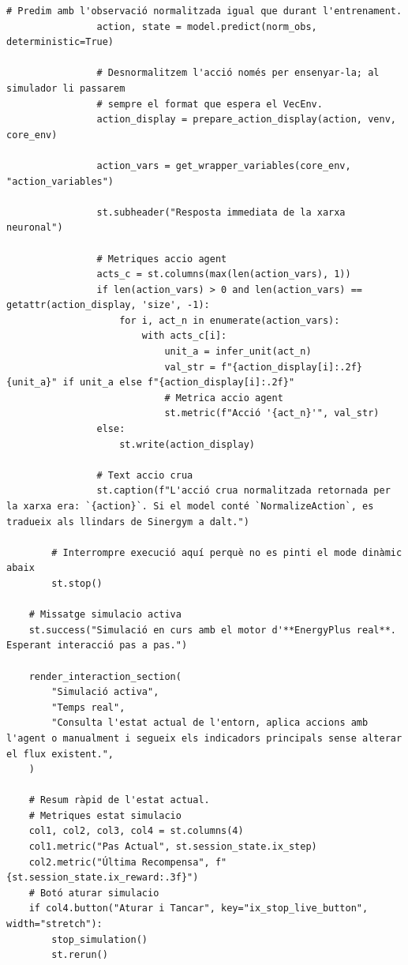 \documentclass[10pt,a4paper]{article}
\begin{document}
\begin{lstlisting}[style=studioPython,caption={pages/Interaccionar\_amb\_l'Agent.py},label={lst:pages-interaccionar-amb-l-agent-py}]
                # Predim amb l'observació normalitzada igual que durant l'entrenament.
                action, state = model.predict(norm_obs, deterministic=True)

                # Desnormalitzem l'acció només per ensenyar-la; al simulador li passarem
                # sempre el format que espera el VecEnv.
                action_display = prepare_action_display(action, venv, core_env)

                action_vars = get_wrapper_variables(core_env, "action_variables")

                st.subheader("Resposta immediata de la xarxa neuronal")

                # Metriques accio agent
                acts_c = st.columns(max(len(action_vars), 1))
                if len(action_vars) > 0 and len(action_vars) == getattr(action_display, 'size', -1):
                    for i, act_n in enumerate(action_vars):
                        with acts_c[i]:
                            unit_a = infer_unit(act_n)
                            val_str = f"{action_display[i]:.2f} {unit_a}" if unit_a else f"{action_display[i]:.2f}"
                            # Metrica accio agent
                            st.metric(f"Acció '{act_n}'", val_str)
                else:
                    st.write(action_display)

                # Text accio crua
                st.caption(f"L'acció crua normalitzada retornada per la xarxa era: `{action}`. Si el model conté `NormalizeAction`, es tradueix als llindars de Sinergym a dalt.")

        # Interrompre execució aquí perquè no es pinti el mode dinàmic abaix
        st.stop()

    # Missatge simulacio activa
    st.success("Simulació en curs amb el motor d'**EnergyPlus real**. Esperant interacció pas a pas.")

    render_interaction_section(
        "Simulació activa",
        "Temps real",
        "Consulta l'estat actual de l'entorn, aplica accions amb l'agent o manualment i segueix els indicadors principals sense alterar el flux existent.",
    )

    # Resum ràpid de l'estat actual.
    # Metriques estat simulacio
    col1, col2, col3, col4 = st.columns(4)
    col1.metric("Pas Actual", st.session_state.ix_step)
    col2.metric("Última Recompensa", f"{st.session_state.ix_reward:.3f}")
    # Botó aturar simulacio
    if col4.button("Aturar i Tancar", key="ix_stop_live_button", width="stretch"):
        stop_simulation()
        st.rerun()


\end{lstlisting}
\end{document}

